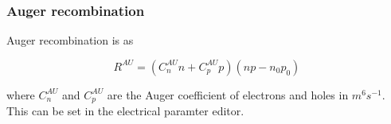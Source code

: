 \subsubsection{Auger recombination}

Auger recombination is as

\begin{equation}
R^{AU}=(C^{AU}_{n}n+C^{AU}_{p}p)(np-n_{0}p_{0})
\end{equation}

where $C^{AU}_{n}$ and $C^{AU}_{p}$ are the Auger coefficient of electrons and holes in $m^6 s^{-1}$. This can be set in the electrical paramter editor.

